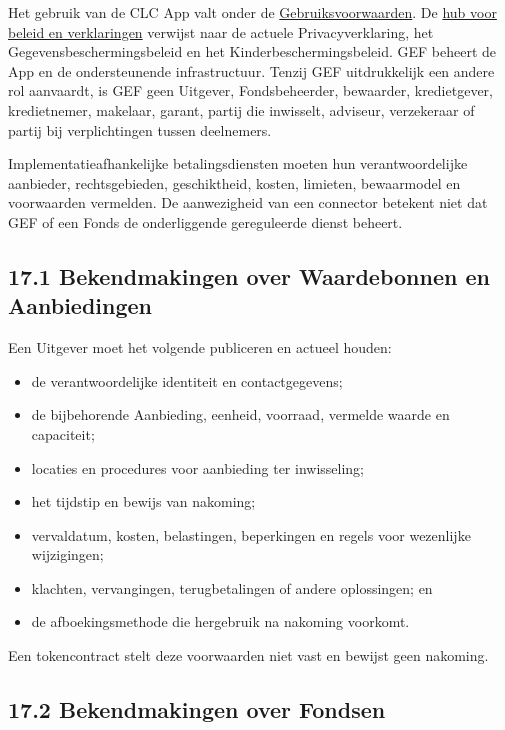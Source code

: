 \documentclass[11pt]{article}
\begin{document}
Het gebruik van de CLC App valt onder de \href{https://docs.cosmolocal.credit/nl/governance/terms}{Gebruiksvoorwaarden}. De \href{https://docs.cosmolocal.credit/nl/governance/policies}{hub voor beleid en verklaringen} verwijst naar de actuele Privacyverklaring, het Gegevensbeschermingsbeleid en het Kinderbeschermingsbeleid. GEF beheert de App en de ondersteunende infrastructuur. Tenzij GEF uitdrukkelijk een andere rol aanvaardt, is GEF geen Uitgever, Fondsbeheerder, bewaarder, kredietgever, kredietnemer, makelaar, garant, partij die inwisselt, adviseur, verzekeraar of partij bij verplichtingen tussen deelnemers.

Implementatieafhankelijke betalingsdiensten moeten hun verantwoordelijke aanbieder, rechtsgebieden, geschiktheid, kosten, limieten, bewaarmodel en voorwaarden vermelden. De aanwezigheid van een connector betekent niet dat GEF of een Fonds de onderliggende gereguleerde dienst beheert.

\subsection*{17.1 Bekendmakingen over Waardebonnen en Aanbiedingen}

Een Uitgever moet het volgende publiceren en actueel houden:

\begin{itemize}[leftmargin=*]
\item de verantwoordelijke identiteit en contactgegevens;
\item de bijbehorende Aanbieding, eenheid, voorraad, vermelde waarde en capaciteit;
\item locaties en procedures voor aanbieding ter inwisseling;
\item het tijdstip en bewijs van nakoming;
\item vervaldatum, kosten, belastingen, beperkingen en regels voor wezenlijke wijzigingen;
\item klachten, vervangingen, terugbetalingen of andere oplossingen; en
\item de afboekingsmethode die hergebruik na nakoming voorkomt.
\end{itemize}
Een tokencontract stelt deze voorwaarden niet vast en bewijst geen nakoming.

\subsection*{17.2 Bekendmakingen over Fondsen}
\end{document}
